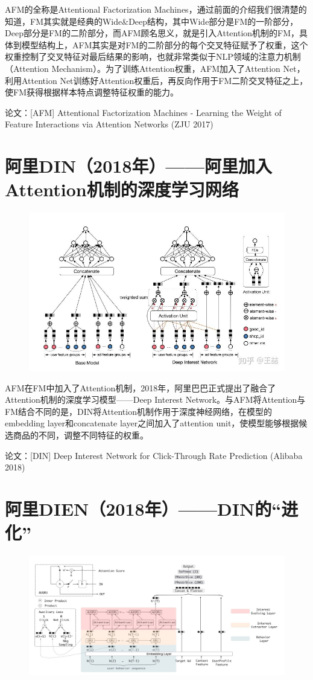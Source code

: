 \documentclass[12pt]{article}
\begin{document}
AFM的全称是Attentional Factorization Machines，通过前面的介绍我们很清楚的知道，FM其实就是经典的Wide\&Deep结构，其中Wide部分是FM的一阶部分，Deep部分是FM的二阶部分，而AFM顾名思义，就是引入Attention机制的FM，具体到模型结构上，AFM其实是对FM的二阶部分的每个交叉特征赋予了权重，这个权重控制了交叉特征对最后结果的影响，也就非常类似于NLP领域的注意力机制（Attention Mechanism）。为了训练Attention权重，AFM加入了Attention Net，利用Attention Net训练好Attention权重后，再反向作用于FM二阶交叉特征之上，使FM获得根据样本特点调整特征权重的能力。

论文：[AFM] Attentional Factorization Machines - Learning the Weight of Feature Interactions via Attention Networks (ZJU 2017)

\section{阿里DIN（2018年）——阿里加入Attention机制的深度学习网络}
\begin{figure}[H]
    \centering
    \includegraphics[width=.8\textwidth]{fig/Ali_DIN_Structure.jpg}
\end{figure}

AFM在FM中加入了Attention机制，2018年，阿里巴巴正式提出了融合了Attention机制的深度学习模型——Deep Interest Network。与AFM将Attention与FM结合不同的是，DIN将Attention机制作用于深度神经网络，在模型的embedding layer和concatenate layer之间加入了attention unit，使模型能够根据候选商品的不同，调整不同特征的权重。

论文：[DIN] Deep Interest Network for Click-Through Rate Prediction (Alibaba 2018)

\section{阿里DIEN（2018年）——DIN的“进化”}
\begin{figure}[H]
    \centering
    \includegraphics[width=1\textwidth]{fig/Ali_DIEN_Structure.jpg}
\end{figure}
\end{document}
